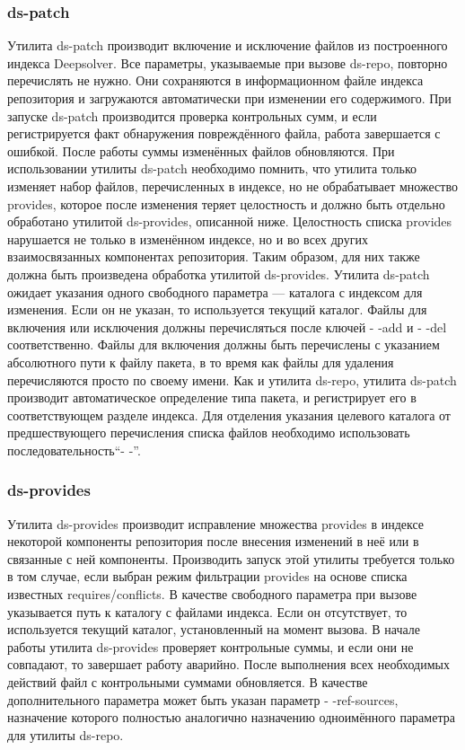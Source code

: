 \subsubsection{ds-patch}
Утилита ds-patch производит включение и исключение файлов из построенного
индекса Deepsolver. Все параметры, указываемые при вызове ds-repo,
повторно перечислять не нужно. Они сохраняются в информационном файле
индекса репозитория и загружаются автоматически при изменении его содержимого.
При запуске ds-patch производится проверка контрольных сумм, и
если регистрируется факт обнаружения повреждённого файла, работа завершается
с ошибкой. После работы суммы изменённых файлов обновляются.
При использовании утилиты ds-patch необходимо помнить, что утилита
только изменяет набор файлов, перечисленных в индексе, но не обрабатывает
множество provides, которое после изменения теряет целостность и
должно быть отдельно обработано утилитой ds-provides, описанной ниже. 
Целостность списка provides нарушается не только в изменённом индексе, но и
во всех других взаимосвязанных компонентах репозитория. Таким образом,
для них также должна быть произведена обработка утилитой ds-provides.
Утилита ds-patch ожидает указания одного свободного параметра — каталога
с индексом для изменения. Если он не указан, то используется текущий
каталог. Файлы для включения или исключения должны перечисляться после ключей
- -add и - -del соответственно. Файлы для включения должны быть перечислены 
с указанием абсолютного пути к файлу пакета, в то время как файлы для удаления 
перечисляются просто по своему имени. Как и утилита ds-repo, утилита ds-patch
производит автоматическое определение типа пакета, и регистрирует его в
соответствующем разделе индекса. Для отделения указания целевого каталога 
от предшествующего перечисления списка файлов необходимо использовать
последовательность“- -”.

\subsubsection{ds-provides}
Утилита ds-provides производит исправление множества provides в индексе
некоторой компоненты репозитория после внесения изменений в неё или
в связанные с ней компоненты. Производить запуск этой утилиты требуется
только в том случае, если выбран режим фильтрации provides на основе
списка известных requires/conflicts. В качестве свободного параметра при 
вызове указывается путь к каталогу с файлами индекса. Если он отсутствует,
то используется текущий каталог, установленный на момент вызова. В начале
работы утилита ds-provides проверяет контрольные суммы, и если они
не совпадают, то завершает работу аварийно. После выполнения всех 
необходимых действий файл с контрольными суммами обновляется. В качестве
дополнительного параметра может быть указан параметр - -ref-sources,
назначение которого полностью аналогично назначению одноимённого параметра
для утилиты ds-repo.



